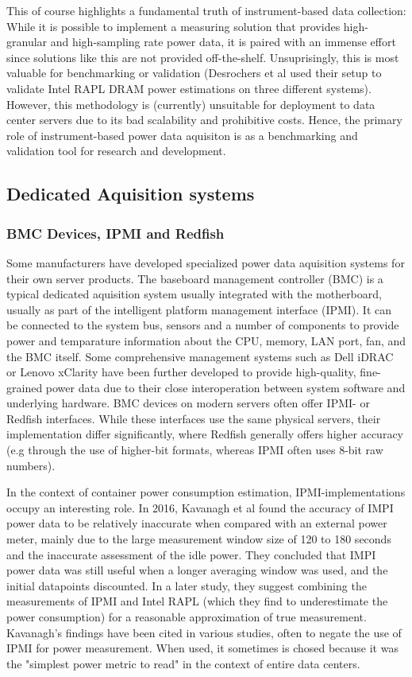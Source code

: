 This of course highlights a fundamental truth of instrument-based data collection: While it is possible to implement a measuring solution that provides high-granular and high-sampling rate power data, it is paired with an immense effort since solutions like this are not provided off-the-shelf. Unsuprisingly, this is most valuable for benchmarking or validation (Desrochers et al used their setup to validate Intel RAPL DRAM power estimations on three different systems). However, this methodology is (currently) unsuitable for deployment to data center servers due to its bad scalability and prohibitive costs. Hence, the primary role of instrument-based power data aquisiton is as a benchmarking and validation tool for research and development.

\subsection{Dedicated Aquisition systems}
\subsubsection{BMC Devices, IPMI and Redfish}
Some manufacturers have developed specialized power data aquisition systems for their own server products. The baseboard management controller (BMC) is a typical dedicated aquisition system usually integrated with the motherboard, usually as part of the intelligent platform management interface (IPMI)\parencite{lin2020taxonomy}. It can be connected to the system bus, sensors and a number of components to provide power and temparature information about the CPU, memory, LAN port, fan, and the BMC itself. Some comprehensive management systems such as Dell iDRAC or Lenovo xClarity have been further developed to provide high-quality, fine-grained power data due to their close interoperation between system software and underlying hardware. BMC devices on modern servers often offer IPMI- or Redfish interfaces. While these interfaces use the same physical servers, their implementation differ significantly, where Redfish generally offers higher accuracy (e.g through the use of higher-bit formats, whereas IPMI often uses 8-bit raw numbers).

In the context of container power consumption estimation, IPMI-implementations occupy an interesting role. In 2016, Kavanagh et al\parencite{kavanagh2016accuracy} found the accuracy of IMPI power data to be relatively inaccurate when compared with an external power meter, mainly due to the large measurement window size of 120 to 180 seconds and the inaccurate assessment of the idle power. They concluded that IMPI power data was still useful when a longer averaging window was used, and the initial datapoints discounted. In a later study, they suggest combining the measurements of IPMI and Intel RAPL (which they find to underestimate the power consumption) for a reasonable approximation of true measurement\parencite{kavanagh2019rapid}. Kavanagh's findings have been cited in various studies, often to negate the use of IPMI for power measurement. When used, it sometimes is chosed because it was the "simplest power metric to read"\parencite{white2020monitoring} in the context of entire data centers.

